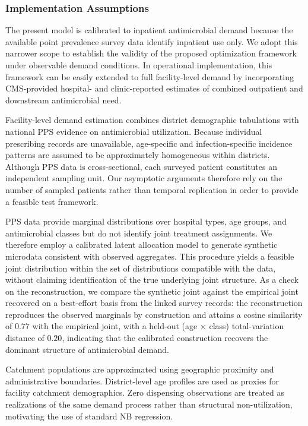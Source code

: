 \documentclass{article}
\begin{document}
\subsubsection{Implementation Assumptions}
\label{ppsassumptions}

The present model is calibrated to inpatient antimicrobial demand because the available point prevalence survey data identify inpatient use only. We adopt this narrower scope to establish the validity of the proposed optimization framework under observable demand conditions. In operational implementation, this framework can be easily extended to full facility-level demand by incorporating CMS-provided hospital- and clinic-reported estimates of combined outpatient and downstream antimicrobial need.

Facility-level demand estimation combines district demographic tabulations with national PPS evidence on antimicrobial utilization. Because individual prescribing records are unavailable, age-specific and infection-specific incidence patterns are assumed to be approximately homogeneous within districts. Although PPS data is cross-sectional, each surveyed patient constitutes an independent sampling unit. Our asymptotic arguments therefore rely on the number of sampled patients rather than temporal replication in order to provide a feasible test framework.

PPS data provide marginal distributions over hospital types, age groups, and antimicrobial classes but do not identify joint treatment assignments. We therefore employ a calibrated latent allocation model to generate synthetic microdata consistent with observed aggregates. This procedure yields a feasible joint distribution within the set of distributions compatible with the data, without claiming identification of the true underlying joint structure. As a check on the reconstruction, we compare the synthetic joint against the empirical joint recovered on a best-effort basis from the linked survey records: the reconstruction reproduces the observed marginals by construction and attains a cosine similarity of $0.77$ with the empirical joint, with a held-out (age $\times$ class) total-variation distance of $0.20$, indicating that the calibrated construction recovers the dominant structure of antimicrobial demand.

Catchment populations are approximated using geographic proximity and administrative boundaries. District-level age profiles are used as proxies for
facility catchment demographics. Zero dispensing observations are treated as realizations of the same demand process rather than structural non-utilization, motivating the use of standard NB regression.
\end{document}
